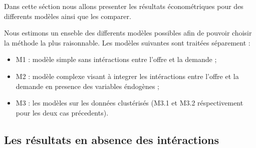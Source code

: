 \documentclass[11pt,]{article}
\providecommand{\tightlist}{%
  \setlength{\itemsep}{0pt}\setlength{\parskip}{0pt}}
\begin{document}
Dans cette séction nous allons presenter les résultats économétriques
pour des differents modèles ainsi que les comparer.

Nous estimons un enseble des differents modèles possibles afin de
pouvoir choisir la méthode la plus raisonnable. Les modèles suivantes
sont traitées séparement :

\begin{itemize}
\tightlist
\item
  M1 : modèle simple sans intéractions entre l'offre et la demande ;
\item
  M2 : modèle complexe visant à integrer les intéractions entre l'offre
  et la demande en presence des variables éndogènes ;
\item
  M3 : les modèles sur les données clustérisés (M3.1 et M3.2
  réspectivement pour les deux cas précedents).
\end{itemize}

\hypertarget{les-resultats-en-absence-des-interactions}{%
\subsection{Les résultats en absence des
intéractions}\label{les-resultats-en-absence-des-interactions}}

\FloatBarrier
\end{document}
